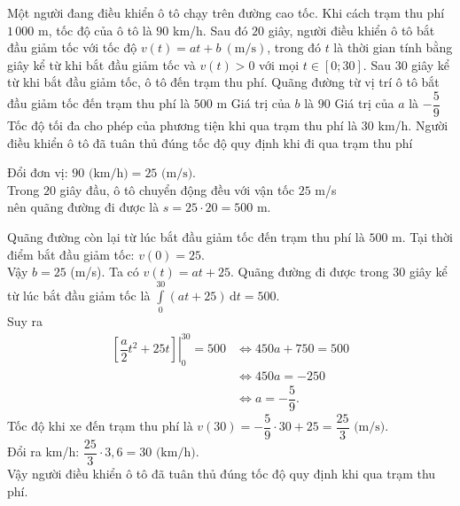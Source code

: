 \begin{ex}%
	Một người đang điều khiển ô tô chạy trên đường cao tốc. Khi cách trạm thu phí $1\, 000$ m, tốc độ của ô tô là $90$ km/h. Sau đó $20$ giây, người điều khiển ô tô bắt đầu giảm tốc với tốc độ $v(t)=at+b \ (\text{m/s})$, trong đó $t$ là thời gian tính bằng giây kể từ khi bắt đầu giảm tốc và $v(t)>0$ với mọi $t\in[0;30]$. Sau $30$ giây kể từ khi bắt đầu giảm tốc, ô tô đến trạm thu phí.
	\choiceTF
	{\True Quãng đường từ vị trí ô tô bắt đầu giảm tốc đến trạm thu phí là $500$ m}
	{Giá trị của $b$ là $90$}
	{\True Giá trị của $a$ là $-\dfrac{5}{9}$}
	{\True Tốc độ tối đa cho phép của phương tiện khi qua trạm thu phí là $30$ km/h. Người điều khiển ô tô đã tuân thủ đúng tốc độ quy định khi đi qua trạm thu phí}
	\loigiai
	{
	Đổi đơn vị: $90\text{ (km/h)}=25\text{ (m/s)}$.\\
	Trong $20$ giây đầu, ô tô chuyển động đều với vận tốc $25$ m/s \\
	nên quãng đường đi được là $s=25\cdot 20=500\text{ m}$.
	\begin{itemchoice}
		\itemch Quãng đường còn lại từ lúc bắt đầu giảm tốc đến trạm thu phí là $500$ m.
		\itemch Tại thời điểm bắt đầu giảm tốc: $v(0)=25$.\\
		Vậy $b=25$ (m/s).
		\itemch Ta có $v(t)=at+25$.	
		Quãng đường đi được trong $30$ giây kể từ lúc bắt đầu giảm tốc là $\displaystyle \int\limits_0^{30}(at+25)\mathrm{\,d}t=500$.\\
		Suy ra 
		\begin{align*}
		\left. \left[\dfrac{a}{2}t^2+25t\right] \right|_0^{30}=500	& \Leftrightarrow 450a+750=500 \\
		 &\Leftrightarrow 450a=-250\\
		 &\Leftrightarrow a=-\dfrac{5}{9}.
		\end{align*}
		\itemch Tốc độ khi xe đến trạm thu phí là $v(30)=-\dfrac{5}{9}\cdot 30+25 =\dfrac{25}{3}\text{ (m/s)}$.\\
		Đổi ra km/h: $\dfrac{25}{3}\cdot 3{,}6=30\text{ (km/h)}$.\\
		Vậy người điều khiển ô tô đã tuân thủ đúng tốc độ quy định khi qua trạm thu phí.
	\end{itemchoice}
	}
\end{ex}

